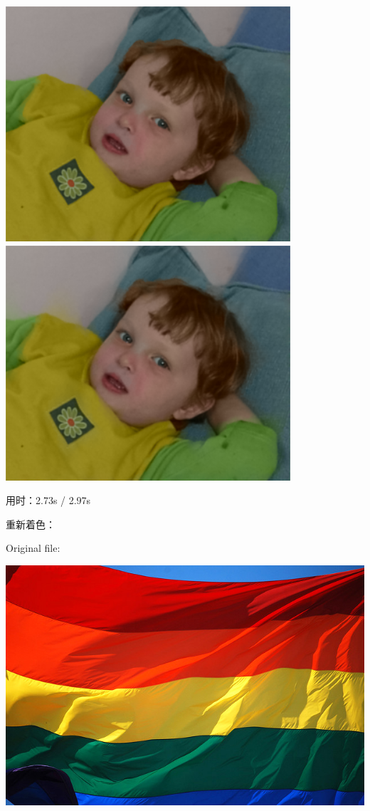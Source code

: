 \documentclass[12pt, a4paper, oneside]{report}
\begin{document}
	\centerline{
	\includegraphics[scale=0.65]{baby_colorized.png}
	\includegraphics[scale=0.65]{baby_colorized3.png}}
	

	
	\noindent 用时：2.73s / 2.97s
	
	\noindent 重新着色：
	
	\noindent Original file: 
	
	\centerline{
		\includegraphics[scale=0.3]{flag_original.png}}
	
\end{document}
